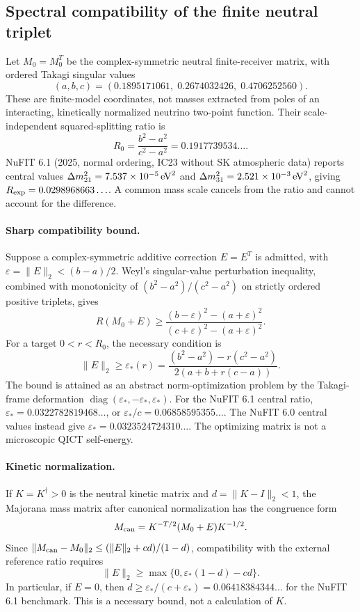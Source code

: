 \subsection{Spectral compatibility of the finite neutral triplet}
\label{sec:qict-neutral-spectral-compatibility-2026}
Let $M_0=M_0^T$ be the complex-symmetric neutral finite-receiver matrix,
with ordered Takagi singular values
\[
(a,b,c)=(0.1895171061,\;0.2674032426,\;0.4706252560).
\]
These are finite-model coordinates, not masses extracted from poles of an
interacting, kinetically normalized neutrino two-point function. Their
scale-independent squared-splitting ratio is
\[
R_0=\frac{b^2-a^2}{c^2-a^2}=0.1917739534\ldots.
\]
NuFIT 6.1 (2025, normal ordering, IC23 without SK atmospheric data)
reports central values $\Delta m_{21}^2=7.537\times10^{-5}\,
{\rm eV}^2$ and $\Delta m_{31}^2=2.521\times10^{-3}\,
{\rm eV}^2$, giving $R_{\rm exp}=0.0298968663\ldots$.
A common mass scale cancels from the ratio and cannot account for the
difference.

\paragraph{Sharp compatibility bound.}
Suppose a complex-symmetric additive correction $E=E^T$ is admitted,
with $\varepsilon=\|E\|_2<(b-a)/2$. Weyl's singular-value
perturbation inequality, combined with monotonicity of
$(b^2-a^2)/(c^2-a^2)$ on strictly ordered positive triplets, gives
\[
R(M_0+E)\ge
\frac{(b-\varepsilon)^2-(a+\varepsilon)^2}
{(c+\varepsilon)^2-(a+\varepsilon)^2}.
\]
For a target $0<r<R_0$, the necessary condition is
\begin{equation}\label{eq:qict-nu-epsilon-sharp-2026}
\|E\|_2\ge\varepsilon_*(r)
=\frac{(b^2-a^2)-r(c^2-a^2)}
{2(a+b+r(c-a))}.
\end{equation}
The bound is attained as an abstract norm-optimization problem by the
Takagi-frame deformation
$\operatorname{diag}(\varepsilon_*,-\varepsilon_*,\varepsilon_*)$.
For the NuFIT 6.1 central ratio,
$\varepsilon_*=0.0322782819468\ldots$, or
$\varepsilon_*/c=0.06858595355\ldots$.
The NuFIT 6.0 central values instead give
$\varepsilon_*=0.0323524724310\ldots$.
The optimizing matrix is not a microscopic QICT self-energy.

\paragraph{Kinetic normalization.}
If $K=K^\dagger>0$ is the neutral kinetic matrix and
$d=\|K-I\|_2<1$, the Majorana mass matrix after canonical normalization
has the congruence form
\[
M_{\rm can}=K^{-T/2}(M_0+E)K^{-1/2}.
\]
Since
$\|M_{\rm can}-M_0\|_2\le(\|E\|_2+cd)/(1-d)$,
compatibility with the external reference ratio requires
\[
\|E\|_2\ge\max\{0,\varepsilon_*(1-d)-cd\}.
\]
In particular, if $E=0$, then
$d\ge\varepsilon_*/(c+\varepsilon_*)
=0.06418384344\ldots$ for the NuFIT 6.1 benchmark.
This is a necessary bound, not a calculation of $K$.

